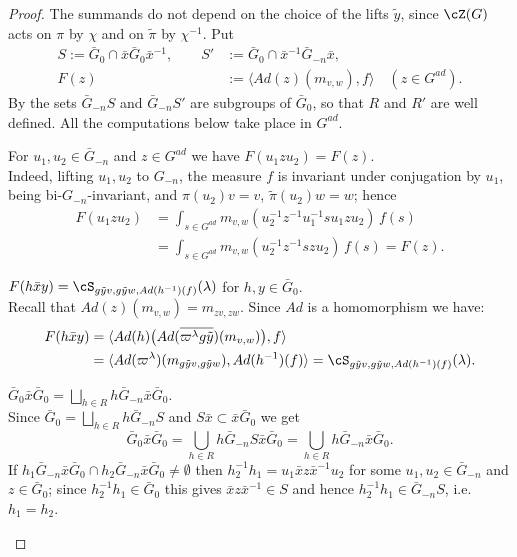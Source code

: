 \documentclass[12pt,a4paper]{amsart}%
\newcommand{\RamiE}[1]{{{#1}}}
\begin{document}
\begin{proof}
The summands do not depend on the choice of the lifts $\tilde y$, since $\cZ(G)$ acts on $\pi$ by $\chi$ and on $\tilde\pi$ by $\chi^{-1}$. Put
\begin{align*}
S:=\bar G_0 \cap  \bar x \bar G_0 \bar x^{-1},\qquad S'&:=\bar G_0 \cap  \bar x^{-1} \bar G_{-n} \bar x,\\
F(z)&:=\langle Ad(z)(m_{v,w}),f\rangle\quad (z\in G^{ad}) .
\end{align*}
By  the sets $\bar G_{-n}S$ and $\bar G_{-n}S'$ are subgroups of $\bar G_0$, so that $R$ and $R'$ are well defined. All the computations below take place in $G^{ad}$.
\begin{enumerate}[Step 1.]
    \item\label{lem:S0.decomp:1} 
For $u_1,u_2\in \bar G_{-n}$ and $z\in G^{ad}$ we have $F(u_1zu_2)=F(z)$.\\
Indeed, lifting $u_1,u_2$ to $G_{-n}$, the measure $f$ is invariant under conjugation by $u_1$, being bi-$G_{-n}$-invariant, and $\pi(u_2)v=v$, $\tilde\pi(u_2)w=w$; hence
\begin{align*}
F(u_1zu_2)&=\int_{\RamiE{s\in G^{ad}}} m_{v,w}(u_2^{-1}z^{-1}u_1^{-1}su_1zu_2)\,\RamiE{f}(s)\\
&=\int_{\RamiE{s\in G^{ad}}} m_{v,w}(u_2^{-1}z^{-1}szu_2)\,\RamiE{f}(s)=F(z).
\end{align*}
\RamiE{
\item\label{lem:S0.decomp:1.1} $F(h\bar x y)=\cS_{g\tilde yv,g\tilde yw,Ad(h^{-1})(f)}(\lambda)$ for $h,y\in\bar G_0$.\\
Recall that $Ad(z)(m_{v,w})=m_{zv,zw}$. Since $Ad$ is a homomorphism we have:
\begin{align*}
F(h\bar xy)&=\langle Ad(h)\bigl(Ad(\overline{\varpi^{\lambda}g\tilde y})(m_{v,w})\bigr),f\rangle\\
&=\langle Ad(\varpi^\lambda)(m_{g\tilde yv,g\tilde yw}),Ad(h^{-1})(f)\rangle=\cS_{g\tilde yv,g\tilde yw,Ad(h^{-1})(f)}(\lambda).
\end{align*}
}
\item\label{lem:S0.decomp:2} $\bar G_0\bar x\bar G_0=\bigsqcup_{h\in R}h\bar G_{-n}\bar x\bar G_0$.\\
Since $\bar G_0=\bigsqcup_{h\in R}h\bar G_{-n}S$ and $S\bar x\subset \bar x\bar G_0$ we get
$$\bar G_0\bar x\bar G_0=\bigcup_{h\in R}h\bar G_{-n}S\bar x\bar G_0=\bigcup_{h\in R}h\bar G_{-n}\bar x\bar G_0 .$$
If $h_1\bar G_{-n}\bar x\bar G_0\cap h_2\bar G_{-n}\bar x\bar G_0\neq\emptyset$ then $h_2^{-1}h_1=u_1\bar xz\bar x^{-1}u_2$ for some $u_1,u_2\in \bar G_{-n}$ and $z\in \bar G_0$; since $h_2^{-1}h_1\in \bar G_0$ this gives $\bar xz\bar x^{-1}\in S$ and hence $h_2^{-1}h_1\in \bar G_{-n}S$, i.e. $h_1=h_2$.


\end{enumerate}
\end{proof}
\end{document}
